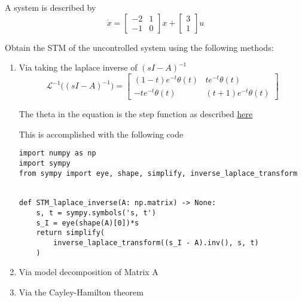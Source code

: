 \item A system is described by
  \begin{equation}
\dot x = \begin{bmatrix}
-2 & 1\\
-1 & 0
\end{bmatrix}
x + \begin{bmatrix}
3\\
1
\end{bmatrix}
u\end{equation}

  Obtain the STM of the uncontrolled system using the following methods:
  \begin{enumerate}
  \item Via taking the laplace inverse of $(sI - A)^{-1}$ \\
    \begin{equation}
\mathscr{L}^{-1}\Big ((sI-A)^{-1}\Big ) = \left[\begin{matrix}\left(1 - t\right) e^{- t} \theta\left(t\right) & t e^{- t} \theta\left(t\right)\\- t e^{- t} \theta\left(t\right) & \left(t + 1\right) e^{- t} \theta\left(t\right)\end{matrix}\right]\end{equation}

    
    The theta in the equation is the step function as described
    \href{https://math.stackexchange.com/questions/1967109/inverse-laplace-transfrom-using-sympy}{here}
    
    This is accomplished with the following code
    \begin{verbatim}
import numpy as np
import sympy
from sympy import eye, shape, simplify, inverse_laplace_transform


def STM_laplace_inverse(A: np.matrix) -> None:
    s, t = sympy.symbols('s, t')
    s_I = eye(shape(A)[0])*s
    return simplify(
        inverse_laplace_transform((s_I - A).inv(), s, t)
    )
\end{verbatim}

  \item Via model decomposition of Matrix A
  \item Via the Cayley-Hamilton theorem
  \end{enumerate}